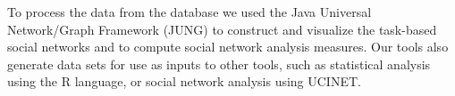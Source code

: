 
To process the data from the database we used the Java Universal Network/Graph
Framework (JUNG) to construct and visualize the task-based social networks and to
compute social network analysis measures. Our tools also generate data sets for
use as inputs to other tools, such as statistical analysis using the R language,
or social network analysis using UCINET.




